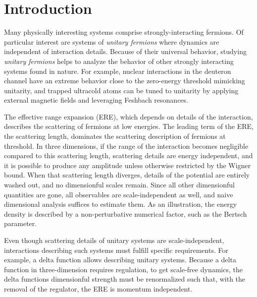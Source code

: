 \section{Introduction}\label{sec:intro}
Many physically interesting systems comprise strongly-interacting fermions.
Of particular interest are systems of \emph{unitary fermions} where dynamics are independent of interaction details.
Because of their universal behavior, studying \emph{unitary fermions} helps to analyze the behavior of other strongly interacting systems found in nature.
For example, nuclear interactions in the deuteron channel have an extreme behavior close to the zero-energy threshold mimicking unitarity, and trapped ultracold atoms can be tuned to unitarity by applying external magnetic fields and leveraging Feshbach resonances.

The effective range expansion (ERE), which depends on details of the interaction, describes the scattering of fermions at low energies.
The leading term of the ERE, the scattering length, dominates the scattering description of fermions at threshold.
In three dimensions, if the range of the interaction becomes negligible compared to this scattering length, scattering details are energy independent, and it is possible to produce any amplitude unless otherwise restricted by the Wigner bound\cite{Wigner:1955zz, Phillips:1996ae, Hammer:2010fw}.
When that scattering length diverges, details of the potential are entirely washed out, and no dimensionful scales remain.
Since all other dimensionful quantities are gone, all observables are scale-independent as well, and naive dimensional analysis suffices to estimate them.
As an illustration, the energy density is described by a non-perturbative numerical factor, such as the Bertsch parameter\cite{PhysRevC.60.054311}.

Even though scattering details of unitary systems are scale-independent, interactions describing such systems must fulfill specific requirements.
For example, a delta function allows describing unitary systems.
Because a delta function in three-dimension requires regulation, to get scale-free dynamics, the delta functions dimensionful strength must be renormalized such that, with the removal of the regulator, the ERE is momentum independent.

